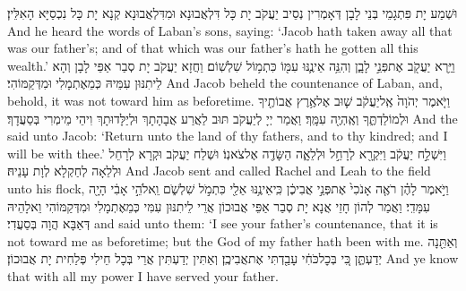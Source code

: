 {וּשְׁמַע יָת פִּתְגָמֵי בְּנֵי לָבָן דְּאָמְרִין נְסֵיב יַעֲקֹב יָת כָּל דִּלְאֲבוּנָא וּמִדִּלְאֲבוּנָא קְנָא יָת כָּל נִכְסַיָּא הָאִלֵּין׃}
{And he heard the words of Laban’s sons, saying: ‘Jacob hath taken away all that was our father’s; and of that which was our father’s hath he gotten all this wealth.’}{}
{וַיַּ֥רְא יַעֲקֹ֖ב אֶת\maqqaf פְּנֵ֣י לָבָ֑ן וְהִנֵּ֥ה אֵינֶ֛נּוּ עִמּ֖וֹ כִּתְמ֥וֹל שִׁלְשֽׁוֹם׃}
{וַחֲזָא יַעֲקֹב יָת סְבַר אַפֵּי לָבָן וְהָא לֵיתִנּוּן עִמֵּיהּ כְּמֵאֶתְמָלִי וּמִדְּקַמּוֹהִי׃}
{And Jacob beheld the countenance of Laban, and, behold, it was not toward him as beforetime.}{}
\newseder
{}%
{וַיֹּ֤אמֶר יְהֹוָה֙ אֶֽל\maqqaf יַעֲקֹ֔ב שׁ֛וּב אֶל\maqqaf אֶ֥רֶץ אֲבוֹתֶ֖יךָ וּלְמוֹלַדְתֶּ֑ךָ וְאֶֽהְיֶ֖ה עִמָּֽךְ׃}
{וַאֲמַר יְיָ לְיַעֲקֹב תּוּב לַאֲרַע אֲבָהָתָךְ וּלְיַלָּדוּתָךְ וִיהֵי מֵימְרִי בְּסַעֲדָךְ׃}
{And the \lord\space said unto Jacob: ‘Return unto the land of thy fathers, and to thy kindred; and I will be with thee.’}{}
{וַיִּשְׁלַ֣ח יַעֲקֹ֔ב וַיִּקְרָ֖א לְרָחֵ֣ל וּלְלֵאָ֑ה הַשָּׂדֶ֖ה אֶל\maqqaf צֹאנֽוֹ׃}
{וּשְׁלַח יַעֲקֹב וּקְרָא לְרָחֵל וּלְלֵאָה לְחַקְלָא לְוָת עָנֵיהּ׃}
{And Jacob sent and called Rachel and Leah to the field unto his flock,}{}
{וַיֹּ֣אמֶר לָהֶ֗ן רֹאֶ֤ה אָנֹכִי֙ אֶת\maqqaf פְּנֵ֣י אֲבִיכֶ֔ן כִּֽי\maqqaf אֵינֶ֥נּוּ אֵלַ֖י כִּתְמֹ֣ל שִׁלְשֹׁ֑ם וֵֽאלֹהֵ֣י אָבִ֔י הָיָ֖ה עִמָּדִֽי׃}
{וַאֲמַר לְהוֹן חָזֵי אֲנָא יָת סְבַר אַפֵּי אֲבוּכוֹן אֲרֵי לֵיתִנּוּן עִמִּי כְּמֵאֶתְמָלִי וּמִדְּקַמּוֹהִי וֵאלָהֵיהּ דְּאַבָּא הֲוָה בְּסַעֲדִי׃}
{and said unto them: ‘I see your father’s countenance, that it is not toward me as beforetime; but the God of my father hath been with me.}{}
{וְאַתֵּ֖נָה יְדַעְתֶּ֑ן כִּ֚י בְּכׇל\maqqaf כֹּחִ֔י עָבַ֖דְתִּי אֶת\maqqaf אֲבִיכֶֽן׃}
{וְאַתִּין יְדַעְתִּין אֲרֵי בְּכָל חֵילִי פְּלַחִית יָת אֲבוּכוֹן׃}
{And ye know that with all my power I have served your father.}{}
